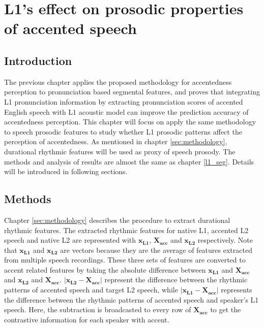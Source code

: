 \chapter{L1's effect on prosodic properties of accented speech}
\label{l1_supraseg}

\section{Introduction}

The previous chapter applies the proposed methodology for accentedness perception to pronunciation based segmental features, and proves that integrating L1 pronunciation information by extracting pronunciation scores of accented English speech with L1 acoustic model can improve the prediction accuracy of accentedness perception. This chapter will focus on apply the same methodology to speech prosodic features to study whether L1 prosodic patterns affect the perception of accentedness. As mentioned in chapter \ref{sec:methodology}, durational rhythmic features will be used as proxy of speech prosody. The methods and analysis of results are almost the same as chapter \ref{l1_seg}. Details will be introduced in following sections.

\section{Methods}

Chapter \ref{sec:methodology} describes the procedure to extract durational rhythmic features. The extracted rhythmic features for native L1, accented L2 speech and native L2 are represented with $\mathbf{x_{L1}}$, $\mathbf{X_{acc}}$ and $\mathbf{x_{L2}}$ respectively. Note that $\mathbf{x_{L1}}$ and $\mathbf{x_{L2}}$ are vectors because they are the average of features extracted from multiple speech recordings. These three sets of features are converted to accent related features by taking the absolute difference between $\mathbf{x_{L1}}$ and $\mathbf{X_{acc}}$ and $\mathbf{x_{L2}}$ and $\mathbf{X_{acc}}$. $\left| \mathbf{x_{L2}}-\mathbf{X_{acc}} \right|$ represent the difference between the rhythmic patterns of accented speech and target L2 speech, while $\left| \mathbf{x_{L1}}- \mathbf{X_{acc}} \right|$ represents the difference between the rhythmic patterns of accented speech and speaker's L1 speech. Here, the subtraction is broadcasted to every row of $\mathbf{X_{acc}}$ to get the contrastive information for each speaker with accent.

